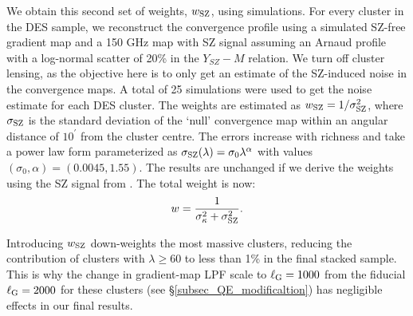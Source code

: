 We obtain this second set of weights, $w_{\rm SZ}$, using simulations. 
For every cluster in the DES sample, we reconstruct the convergence profile using a simulated SZ-free gradient map and a 150 GHz map with SZ signal assuming an Arnaud profile \citep{arnaud10} with a log-normal scatter of 20\% in the $Y_{SZ}-M$ relation. 
We turn off cluster lensing, as the objective here is to only get an estimate of the SZ-induced noise in the convergence maps.
A total of 25 simulations were used to get the noise estimate for each DES cluster.
The weights are estimated as
$w_{\rm SZ} = 1/\sigma_{\rm SZ}^{2}$, where $\sigma_{\rm SZ}$ is the standard deviation of the `null' convergence map within an angular distance of $10^{\prime}$ from the cluster centre.
The errors increase with richness and take a power law form parameterized as $\sigma_{\rm SZ}(\lambda) =  \sigma_{0}\lambda^{\alpha}$ with values $%
(\sigma_{0}, \alpha) = (0.0045, 1.55)$.
The results are unchanged if we derive the weights using the SZ signal from \cite{sehgal10}.
The total weight is now:
 \begin{equation}
 w = \frac{1}{\sigma_{\kappa}^{2} + \sigma_{\rm SZ}^{2}}.
\label{eq_cluster_weight}
 \end{equation}

Introducing $w_{\rm SZ}$ down-weights the most massive clusters, reducing the contribution
of clusters with $\lambda \ge 60$ to less than 1\% in the final stacked sample. 
This is why the change in gradient-map LPF scale to \mbox{$\ell_{\rm G} = 1000$} from the fiducial \mbox{$\ell_{\rm G} = 2000$}
for these clusters (see \S\ref{subsec_QE_modificaltion}) has negligible effects in our final results. 


